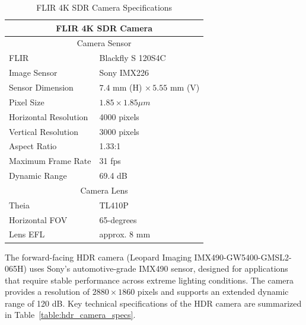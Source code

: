 \documentclass{erauthesis}
\begin{document}
\begin{table}[htbp]
\centering
\begin{tabular}{ll}
\hline
\multicolumn{2}{c}{FLIR 4K SDR Camera}\\
\hline
\hline
\multicolumn{2}{c}{Camera Sensor}\\
\hline
FLIR & Blackfly S 120S4C \\
Image Sensor & Sony IMX226 \\
Sensor Dimension & $7.4$ mm (H) $\times\, 5.55$ mm (V) \\ 
Pixel Size & $1.85 \times 1.85 \mu m$ \\
Horizontal Resolution & 4000 pixels \\
Vertical Resolution & 3000 pixels \\
Aspect Ratio & 1.33:1 \\
Maximum Frame Rate & 31 fps \\
Dynamic Range & 69.4 dB \\
\multicolumn{2}{c}{Camera Lens}\\
\hline
Theia & TL410P\\
Horizontal \Ac{FOV} & 65-degrees\\
Lens \Ac{EFL} & approx. 8 mm\\
\hline
\end{tabular}
\caption{FLIR 4K SDR Camera Specifications}
\label{table:SDR_camera_specs}
\end{table}

 
The forward-facing HDR camera (Leopard Imaging IMX490-GW5400-GMSL2-065H) uses Sony’s automotive-grade IMX490 sensor, designed for applications that require stable performance across extreme lighting conditions. 
The camera provides a resolution of $2880 \times 1860$ pixels and supports an extended dynamic range of 120 dB. 
Key technical specifications of the HDR camera are summarized in Table~\ref{table:hdr_camera_specs}.
\end{document}
